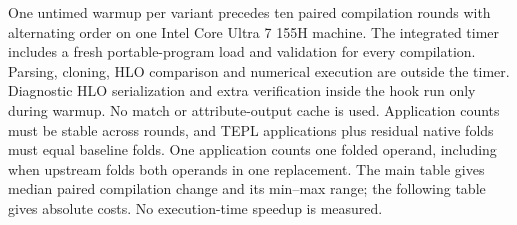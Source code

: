 One untimed warmup per variant precedes ten paired compilation rounds with
alternating order on one Intel Core Ultra 7 155H machine. The integrated
timer includes a fresh portable-program load and validation for every
compilation. Parsing, cloning, HLO comparison and numerical execution are
outside the timer. Diagnostic HLO serialization and extra verification inside
the hook run only during warmup. No match or attribute-output cache is used.
Application counts must be stable across rounds, and TEPL applications plus
residual native folds must equal baseline folds. One application counts one
folded operand, including when upstream folds both operands in one replacement.
The main table gives median paired compilation change and its min--max range;
the following table gives absolute costs. No execution-time speedup is measured.

